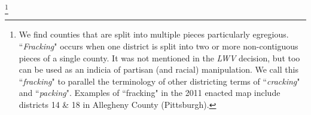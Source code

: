     \footnote{We find counties that are split into multiple pieces particularly egregious. ``\textit{Fracking}" occurs when one district is split into two or more non-contiguous pieces of a single county. It was not mentioned in the \textit{LWV} decision, but too can be used as an indicia of partisan (and racial) manipulation. We call this ``\textit{fracking}" to parallel the terminology of other districting terms of ``\textit{cracking}" and ``\textit{packing}". Examples of ``fracking" in the 2011 enacted map include districts 14 \& 18 in Allegheny County (Pittsburgh).}
